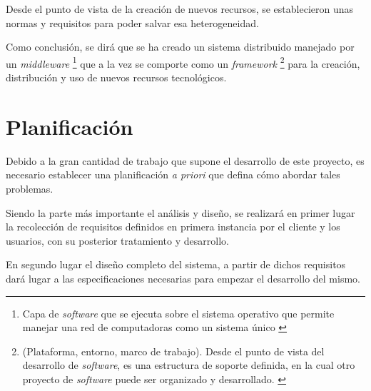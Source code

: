 Desde el punto de vista de la creación de nuevos recursos, se 
establecieron unas normas y requisitos para poder salvar esa 
heterogeneidad.

Como conclusión, se dirá que se ha creado un sistema distribuido 
manejado por un \emph{middleware}  
\footnote{Capa de \emph{software} que se ejecuta sobre el sistema operativo 
que permite manejar una red de computadoras como un sistema único 
\cite{Tanenbaum}} que a la vez se comporte como un 
\emph{framework} \footnote{(Plataforma, entorno, marco de trabajo). 
Desde el punto de vista del desarrollo de \emph{software}, es una 
estructura de soporte definida, en la cual otro proyecto de 
\emph{software} puede ser organizado y desarrollado. \cite{Alegsa}} 
para la creación, distribución y uso de nuevos recursos tecnológicos.

\section{Planificación}

Debido a la gran cantidad de trabajo que supone el desarrollo de este 
proyecto, es necesario establecer una planificación \emph{a priori} que 
defina cómo abordar tales problemas.

Siendo la parte más importante el análisis y diseño, se realizará 
en primer lugar la recolección de requisitos definidos en primera 
instancia por el cliente y los usuarios, con su posterior tratamiento y 
desarrollo.

En segundo lugar el diseño completo del sistema, a partir de dichos 
requisitos dará lugar a las especificaciones necesarias para empezar 
el desarrollo del mismo.


